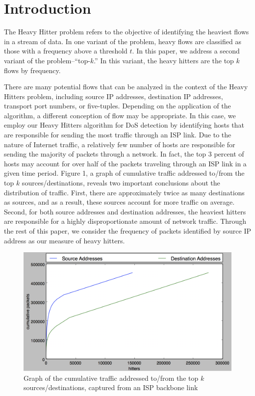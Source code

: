 \section{Introduction}
\label{sec:intro}
The Heavy Hitter problem refers to the objective of identifying the heaviest flows in a stream of data. In one variant of the problem, heavy flows are classified as those with a frequency above a threshold $t$. In this paper, we address a second variant of the problem--``top-$k$.'' In this variant, the heavy hitters are the top $k$ flows by frequency. 

There are many potential flows that can be analyzed in the context of the Heavy Hitters problem, including source IP addresses, destination IP addresses, transport port numbers, or five-tuples. Depending on the application of the algorithm, a different conception of flow may be appropriate. In this case, we employ our Heavy Hitters algorithm for DoS detection by identifying hosts that are responsible for sending the most traffic through an ISP link. Due to the nature of Internet traffic, a relatively few number of hosts are responsible for sending the majority of packets through a network. In fact, the top 3 percent of hosts may account for over half of the packets traveling through an ISP link in a given time period. Figure 1, a graph of cumulative traffic addressed to/from the top $k$ sources/destinations, reveals two important conclusions about the distribution of traffic. First, there are approximately twice as many destinations as sources, and as a result, these sources account for more traffic on average. Second, for both source addresses and destination addresses, the heaviest hitters are responsible for a highly disproportionate amount of network traffic. Through the rest of this paper, we consider the frequency of packets identified by source IP address as our measure of heavy hitters.
\begin{figure}[t]
  \centering
    \includegraphics[scale=0.3]{cumulative}
     \caption{Graph of the cumulative traffic addressed to/from the top $k$ sources/destinations, captured from an ISP backbone link}
     \label{fig:bp-image}
\end{figure}